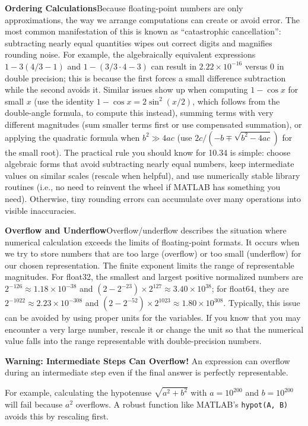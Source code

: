 \textbf{Ordering Calculations}\quad Because floating-point numbers are only approximations, the way we arrange computations can create or avoid error. The most common manifestation of this is known as ``catastrophic cancellation'': subtracting nearly equal quantities wipes out correct digits and magnifies rounding noise. For example, the algebraically equivalent expressions $1-3(4/3-1)$ and $1-(3/3\cdot 4-3)$ can result in $2.22\times10^{-16}$ versus $0$ in double precision; this is because the first forces a small difference subtraction while the second avoids it. Similar issues show up when computing $1-\cos x$ for small $x$ (use the identity $1-\cos x = 2\sin^2(x/2)$, which follows from the double-angle formula, to compute this instead), summing terms with very different magnitudes (sum smaller terms first or use compensated summation), or applying the quadratic formula when $b^2\gg4ac$ (use $2c/(-b\mp\sqrt{b^2-4ac})$ for the small root). The practical rule you should know for 10.34 is simple: choose algebraic forms that avoid subtracting nearly equal numbers, keep intermediate values on similar scales (rescale when helpful), and use numerically stable library routines (i.e., no need to reinvent the wheel if MATLAB has something you need). Otherwise, tiny rounding errors can accumulate over many operations into visible inaccuracies.

\textbf{Overflow and Underflow}\quad  Overflow/underflow describes the situation where numerical calculation exceeds the limits of floating-point formats. It occurs when we try to store numbers that are too large (overflow) or too small (underflow) for our chosen representation. The finite exponent limits the range of representable magnitudes.
For float32, the smallest and largest positive normalized numbers are $2^{-126} \approx 1.18 \times 10^{-38}$ and $(2 - 2^{-23}) \times 2^{127} \approx 3.40 \times 10^{38}$; for float64, they are $2^{-1022} \approx 2.23 \times 10^{-308}$ and $(2 - 2^{-52}) \times 2^{1023} \approx 1.80 \times 10^{308}$. Typically, this issue can be avoided by using proper units for the variables.
If you know that you may encounter a very large number, rescale it or change the unit so that the numerical value falls into the range representable with double-precision numbers.

\begin{warningBox}
    \textbf{Warning: Intermediate Steps Can Overflow!}
    An expression can overflow during an intermediate step even if the final answer is perfectly representable.

    For example, calculating the hypotenuse $\sqrt{a^2 + b^2}$ with $a=10^{200}$ and $b=10^{200}$ will fail because $a^2$ overflows. A robust function like MATLAB's \texttt{hypot(A, B)} avoids this by rescaling first.
\end{warningBox}

